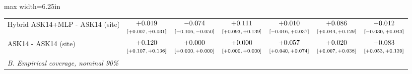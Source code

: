 \begin{table}[htbp]
\begin{adjustbox}{max width=6.25in}
\begin{tabular}{lcccccc}
Hybrid ASK14+MLP - ASK14 (site) & $\begin{array}{@{}c@{}}+0.019\\[-1pt] \scriptstyle[+0.007,\,+0.031]\end{array}$ & $\begin{array}{@{}c@{}}-0.074\\[-1pt] \scriptstyle[-0.106,\,-0.050]\end{array}$ & $\begin{array}{@{}c@{}}+0.111\\[-1pt] \scriptstyle[+0.093,\,+0.139]\end{array}$ & $\begin{array}{@{}c@{}}+0.010\\[-1pt] \scriptstyle[-0.016,\,+0.037]\end{array}$ & $\begin{array}{@{}c@{}}+0.086\\[-1pt] \scriptstyle[+0.044,\,+0.129]\end{array}$ & $\begin{array}{@{}c@{}}+0.012\\[-1pt] \scriptstyle[-0.030,\,+0.043]\end{array}$ \\
ASK14 - ASK14 (site) & $\begin{array}{@{}c@{}}+0.120\\[-1pt] \scriptstyle[+0.107,\,+0.136]\end{array}$ & $\begin{array}{@{}c@{}}+0.000\\[-1pt] \scriptstyle[+0.000,\,+0.000]\end{array}$ & $\begin{array}{@{}c@{}}+0.000\\[-1pt] \scriptstyle[+0.000,\,+0.000]\end{array}$ & $\begin{array}{@{}c@{}}+0.057\\[-1pt] \scriptstyle[+0.040,\,+0.074]\end{array}$ & $\begin{array}{@{}c@{}}+0.020\\[-1pt] \scriptstyle[+0.007,\,+0.038]\end{array}$ & $\begin{array}{@{}c@{}}+0.083\\[-1pt] \scriptstyle[+0.053,\,+0.139]\end{array}$ \\
\midrule
\multicolumn{7}{l}{\textit{B. Empirical coverage, nominal 90\%}} \\

\end{tabular}
\end{adjustbox}
\end{table}
